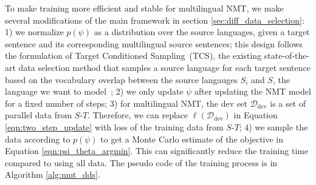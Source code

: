 To make training more efficient and stable for multilingual NMT, we make several modifications of the main framework in section \ref{sec:diff_data_selection}: 1) we normalize $p(\psi)$ as a distribution over the source languages, given a target sentence and its corresponding multilingual source sentences; this design follows the formulation of Target Conditioned Sampling~(TCS), the existing state-of-the-art data selection method that samples a source language for each target sentence based on the vocabulary overlap between the source langauges $S_i$ and $S$, the language we want to model~\citep{TCS}; 2) we only update $\psi$ after updating the NMT model for a fixed number of steps; 3) for multilingual NMT, the dev set $\mathcal{D}_{\text{dev}}$ is a set of parallel data from $S$-$T$. Therefore, we can replace $\ell(\mathcal{D}_{\text{dev}})$ in Equation \ref{eqn:two_step_update} with loss of the training data from $S$-$T$; 4) we sample the data according to $p(\psi)$ to get a Monte Carlo estimate of the objective in Equation \ref{eqn:psi_theta_argmin}. This can significantly reduce the training time compared to using all data. The pseudo code of the training process is in Algorithm \ref{alg:nmt_dds}.


 
